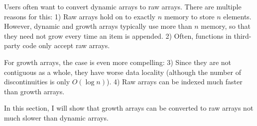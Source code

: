 Users often want to convert dynamic arrays to raw arrays. There are multiple reasons for this: 1) Raw arrays hold on to exactly $n$ memory to store $n$ elements. However, dynamic and growth arrays typically use more than $n$ memory, so that they need not grow every time an item is appended. 2) Often, functions in third-party code only accept raw arrays.

For growth arrays, the case is even more compelling: 3) Since they are not contiguous as a whole, they have worse data locality (although the number of discontinuities is only $O(\log n)$). 4) Raw arrays can be indexed much faster than growth arrays.

In this section, I will show that growth arrays can be converted to raw arrays not much slower than dynamic arrays.